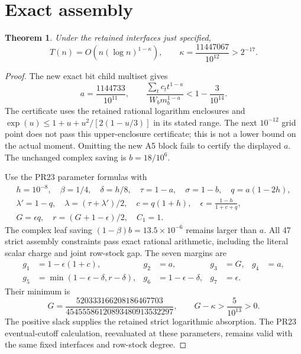 \documentclass[11pt]{article}
\newtheorem{theorem}{Theorem}
\begin{document}
\section{Exact assembly}\label{sec:a5-semantic-assembly}
\begin{theorem}
Under the retained interfaces just specified,
\[
 T(n)=O\!\left(n(\log n)^{1-\kappa}\right),\qquad
 \kappa=\frac{11447067}{10^{12}}>2^{-17}.
\]
\end{theorem}
\begin{proof}
The new exact bit child multiset gives
\[
 a=\frac{1144733}{10^{11}},\qquad
 \frac{\sum_t c_t t^{1-a}}{W_bm_b^{1-a}}<1-\frac3{10^{14}}.
\]
The certificate uses the retained rational logarithm enclosures and
$\exp(u)\le1+u+u^2/[2(1-u/3)]$ in its stated range. The next
$10^{-12}$ grid point does not pass this upper-enclosure certificate;
this is not a lower bound on the actual moment. Omitting the new A5
block fails to certify the displayed $a$.
The unchanged complex saving is $b=18/10^6$.

Use the PR23 parameter formulas with
\[
\begin{gathered}
 h=10^{-8},\quad\beta=1/4,\quad\delta=h/8,\quad
 \tau=1-a,\quad\sigma=1-b,\quad q=a(1-2h),\\
 \lambda'=1-q,\quad\lambda=(\tau+\lambda')/2,\quad
 c=q(1+h),\quad\epsilon=\frac{1-h}{1+c+q},\\
 G=\epsilon q,\quad r=(G+1-\epsilon)/2,\quad C_1=1.
\end{gathered}
\]
The complex leaf saving $(1-\beta)b=13.5\times10^{-6}$ remains larger
than $a$. All 47 strict assembly constraints pass exact rational
arithmetic, including the literal scalar charge and joint row-stock gap.
The seven margins are
\[
\begin{aligned}
 g_1&=1-\epsilon(1+c),&g_2&=a,&g_3&=G,&g_4&=a,\\
 g_5&=\min(1-\epsilon-\delta,r-\delta),&
 g_6&=1-\epsilon-\delta,&g_7&=\epsilon.
\end{aligned}
\]
Their minimum is
\[
 G=\frac{520333166208186467703}{45455586120893480913532297},
 \qquad G-\kappa>\frac5{10^{13}}>0.
\]
The positive slack supplies the retained strict logarithmic absorption.
The PR23 eventual-cutoff calculation, reevaluated at these parameters,
remains valid with the same fixed interfaces and row-stock degree.
\end{proof}
\end{document}
